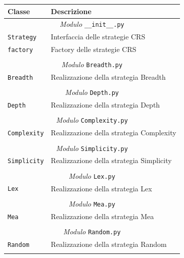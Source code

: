 \begin{longtable}{p{5.5cm}p{6.5cm}}
\hline 
\textbf{Classe} & \textbf{Descrizione} \\ 
\hline\hline 
\endhead

\multicolumn{2}{c}{\emph{Modulo} \texttt{\_\_init\_\_.py}}\\
	\hdashline[5pt/5pt]
		\texttt{Strategy} & Interfaccia delle strategie CRS \\ 
	\hdashline[1pt/5pt]
		\texttt{factory} & Factory delle strategie CRS \\ 
	\hline\\

\multicolumn{2}{c}{\emph{Modulo} \texttt{Breadth.py}}\\
	\hdashline[5pt/5pt]
		\texttt{Breadth} & Realizzazione della strategia Breadth\\ 
	\hline\\
	
\multicolumn{2}{c}{\emph{Modulo} \texttt{Depth.py}}\\
	\hdashline[5pt/5pt]
		\texttt{Depth} & Realizzazione della strategia Depth \\
	\hline\\

\multicolumn{2}{c}{\emph{Modulo} \texttt{Complexity.py}}\\
	\hdashline[5pt/5pt]
		\texttt{Complexity} & Realizzazione della strategia Complexity \\ 
	\hline\\

\multicolumn{2}{c}{\emph{Modulo} \texttt{Simplicity.py}}\\
	\hdashline[5pt/5pt]
		\texttt{Simplicity} & Realizzazione della strategia Simplicity \\ 
	\hline\\

\multicolumn{2}{c}{\emph{Modulo} \texttt{Lex.py}}\\
	\hdashline[5pt/5pt]
		\texttt{Lex} & Realizzazione della strategia Lex \\ 
	\hline\\
	
\multicolumn{2}{c}{\emph{Modulo} \texttt{Mea.py}}\\
	\hdashline[5pt/5pt]
		\texttt{Mea} & Realizzazione della strategia Mea \\ 
	\hline\\

\multicolumn{2}{c}{\emph{Modulo} \texttt{Random.py}}\\
	\hdashline[5pt/5pt]
		\texttt{Random} & Realizzazione della strategia Random \\ 
	\hline\\


\end{longtable}

